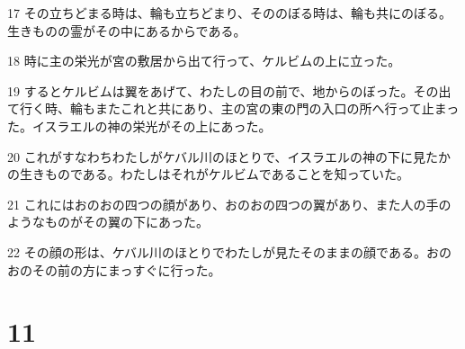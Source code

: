\par 17 その立ちどまる時は、輪も立ちどまり、そののぼる時は、輪も共にのぼる。生きものの霊がその中にあるからである。
\par 18 時に主の栄光が宮の敷居から出て行って、ケルビムの上に立った。
\par 19 するとケルビムは翼をあげて、わたしの目の前で、地からのぼった。その出て行く時、輪もまたこれと共にあり、主の宮の東の門の入口の所へ行って止まった。イスラエルの神の栄光がその上にあった。
\par 20 これがすなわちわたしがケバル川のほとりで、イスラエルの神の下に見たかの生きものである。わたしはそれがケルビムであることを知っていた。
\par 21 これにはおのおの四つの顔があり、おのおの四つの翼があり、また人の手のようなものがその翼の下にあった。
\par 22 その顔の形は、ケバル川のほとりでわたしが見たそのままの顔である。おのおのその前の方にまっすぐに行った。

\chapter{11}

